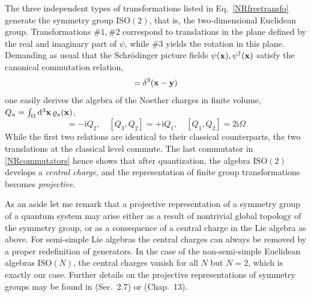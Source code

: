 \documentclass[final,3p,times,12pt,a4paper,sort&compress]{elsarticle}
\newcommand\gr[1]{\mathrm{#1}}              %
\newcommand\vek[1]{{\boldsymbol{\bf #1}}}   %
\newcommand\he[1]{#1^{\dagger}}             %
\newcommand\imag{\mathrm i}                 %
\newcommand\vr{\varrho}
\newcommand\dthree{\mathop{{\rm d}^3\!}\nolimits} %
\begin{document}
The three independent types of transformations listed in
Eq.~\eqref{NRfreetransfo} generate the symmetry group $\gr{ISO(2)}$, that is,
the two-dimensional Euclidean group. Transformations $\#1,\#2$ correspond to
translations in the plane defined by the real and imaginary part of $\psi$,
while $\#3$ yields the rotation in this plane. Demanding as usual that the
Schr\"odinger picture fields $\psi(\vek x),\he\psi(\vek x)$ satisfy the
canonical commutation relation,
\begin{equation}
[\psi(\vek x),\he\psi(\vek y)]=\delta^3(\vek x-\vek y)
\label{NRCCR}
\end{equation}
one easily derives the algebra of the Noether charges in finite
volume, $Q_a=\int_\Omega\dthree\vek x\,\vr_a(\vek x)$,
\begin{equation}
[Q_3,Q_1]=-\imag Q_2,\quad
[Q_3,Q_2]=+\imag Q_1,\quad
[Q_1,Q_2]=2\imag\Omega
\label{NRcommutators}
\end{equation}
While the first two relations are identical to their classical counterparts,
the two translations at the classical level commute. The last commutator in
\eqref{NRcommutators} hence shows that after quantization, the algebra
$\gr{ISO(2)}$ develops a \emph{central charge}, and the representation of
finite group transformations becomes \emph{projective}.

As an aside let me remark that a projective representation of a symmetry group
of a quantum system may arise either as a result of nontrivial global topology
of the symmetry group, or as a consequence of a central charge in the Lie
algebra as above. For semi-simple Lie algebras the central charges can always be
removed by a proper redefinition of generators. In the case of the
non-semi-simple Euclidean algebras $\gr{ISO}(N)$, the central charges vanish for
all $N$ but $N=2$, which is exactly our case. Further details on the projective
representations of symmetry groups may be found in
\cite{Weinberg:1995v1} (Sec.~2.7) or \cite{Barut:1977ba} (Chap.~13).
\end{document}

